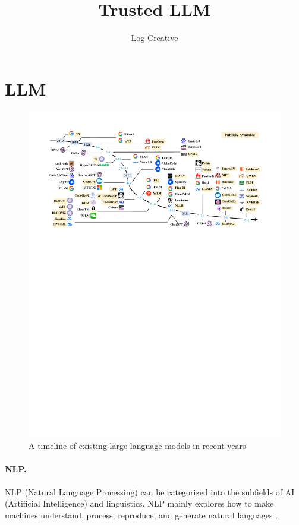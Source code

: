\documentclass[lang=en]{sjtuarticle}
\title{Trusted LLM}  %
\author{Log Creative}
\begin{document}
\maketitle

\tableofcontents*

\section{LLM}\label{sec:llm}

\begin{figure}[h]
    \centering
    \includegraphics[width=\textwidth]{timeline.pdf}
    \caption{A timeline of existing large language models in recent years \cite{zhao2023survey}}
    \label{fig:timeline}
\end{figure}

\paragraph{NLP.}
NLP (Natural Language Processing) can be categorized into the subfields of AI (Artificial Intelligence) and linguistics. NLP mainly explores how to make machines understand,
process, reproduce, and generate natural languages \cite{chang2023natural}.
\end{document}
